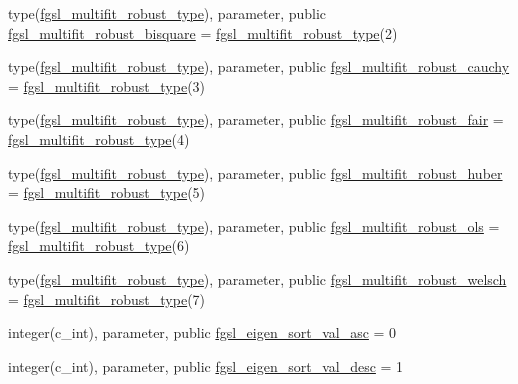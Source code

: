 \begin{DoxyCompactItemize}
\item 
type(\hyperlink{structfgsl_1_1fgsl__multifit__robust__type}{fgsl\+\_\+multifit\+\_\+robust\+\_\+type}), parameter, public \hyperlink{namespacefgsl_a36d1b09a0ed8ea4c5836ecc7e19e143a}{fgsl\+\_\+multifit\+\_\+robust\+\_\+bisquare} = \hyperlink{structfgsl_1_1fgsl__multifit__robust__type}{fgsl\+\_\+multifit\+\_\+robust\+\_\+type}(2)
\item 
type(\hyperlink{structfgsl_1_1fgsl__multifit__robust__type}{fgsl\+\_\+multifit\+\_\+robust\+\_\+type}), parameter, public \hyperlink{namespacefgsl_a106b8dc39c3609e38744526153f66d25}{fgsl\+\_\+multifit\+\_\+robust\+\_\+cauchy} = \hyperlink{structfgsl_1_1fgsl__multifit__robust__type}{fgsl\+\_\+multifit\+\_\+robust\+\_\+type}(3)
\item 
type(\hyperlink{structfgsl_1_1fgsl__multifit__robust__type}{fgsl\+\_\+multifit\+\_\+robust\+\_\+type}), parameter, public \hyperlink{namespacefgsl_a924cc37b78fb66006a7353005347bded}{fgsl\+\_\+multifit\+\_\+robust\+\_\+fair} = \hyperlink{structfgsl_1_1fgsl__multifit__robust__type}{fgsl\+\_\+multifit\+\_\+robust\+\_\+type}(4)
\item 
type(\hyperlink{structfgsl_1_1fgsl__multifit__robust__type}{fgsl\+\_\+multifit\+\_\+robust\+\_\+type}), parameter, public \hyperlink{namespacefgsl_a3f232d8677261e46e3b90159cdbe985a}{fgsl\+\_\+multifit\+\_\+robust\+\_\+huber} = \hyperlink{structfgsl_1_1fgsl__multifit__robust__type}{fgsl\+\_\+multifit\+\_\+robust\+\_\+type}(5)
\item 
type(\hyperlink{structfgsl_1_1fgsl__multifit__robust__type}{fgsl\+\_\+multifit\+\_\+robust\+\_\+type}), parameter, public \hyperlink{namespacefgsl_a21550651577589ca5adf0cdd17517848}{fgsl\+\_\+multifit\+\_\+robust\+\_\+ols} = \hyperlink{structfgsl_1_1fgsl__multifit__robust__type}{fgsl\+\_\+multifit\+\_\+robust\+\_\+type}(6)
\item 
type(\hyperlink{structfgsl_1_1fgsl__multifit__robust__type}{fgsl\+\_\+multifit\+\_\+robust\+\_\+type}), parameter, public \hyperlink{namespacefgsl_a5d48e88448a37e7bdc7af12abc799a83}{fgsl\+\_\+multifit\+\_\+robust\+\_\+welsch} = \hyperlink{structfgsl_1_1fgsl__multifit__robust__type}{fgsl\+\_\+multifit\+\_\+robust\+\_\+type}(7)
\item 
integer(c\+\_\+int), parameter, public \hyperlink{namespacefgsl_ad37ba047f5c1bbd5e2621f94d81a5aa4}{fgsl\+\_\+eigen\+\_\+sort\+\_\+val\+\_\+asc} = 0
\item 
integer(c\+\_\+int), parameter, public \hyperlink{namespacefgsl_a2dac34cd764be6e7de1f57d061c7f5d2}{fgsl\+\_\+eigen\+\_\+sort\+\_\+val\+\_\+desc} = 1

\end{DoxyCompactItemize}
